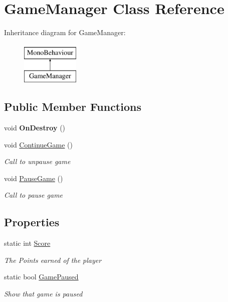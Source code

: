 \hypertarget{class_game_manager}{}\section{Game\+Manager Class Reference}
\label{class_game_manager}
Inheritance diagram for Game\+Manager\+:\begin{figure}[H]
\begin{center}
\leavevmode
\includegraphics[height=2.000000cm]{class_game_manager}
\end{center}
\end{figure}
\subsection*{Public Member Functions}
\begin{DoxyCompactItemize}
\item 
void {\bfseries On\+Destroy} ()\hypertarget{class_game_manager_a246f3c0e365f4eff658e779f4336a4fa}{}\label{class_game_manager_a246f3c0e365f4eff658e779f4336a4fa}

\item 
void \hyperlink{class_game_manager_a2ba50fa10e943f9d7f70ca36ab162742}{Continue\+Game} ()
\begin{DoxyCompactList}\small\item\em Call to unpause game \end{DoxyCompactList}\item 
void \hyperlink{class_game_manager_adb110a6ef474e4ac7901176c97a859ab}{Pause\+Game} ()
\begin{DoxyCompactList}\small\item\em Call to pause game \end{DoxyCompactList}\end{DoxyCompactItemize}
\subsection*{Properties}
\begin{DoxyCompactItemize}
\item 
static int \hyperlink{class_game_manager_a77a552c74394d1e18c0bb2893bd27cb0}{Score}
\begin{DoxyCompactList}\small\item\em The Points earned of the player \end{DoxyCompactList}\item 
static bool \hyperlink{class_game_manager_a9a7aa34c324c433dd80fa0d7d1bf37e8}{Game\+Paused}
\begin{DoxyCompactList}\small\item\em Show that game is paused \end{DoxyCompactList}\end{DoxyCompactItemize}
